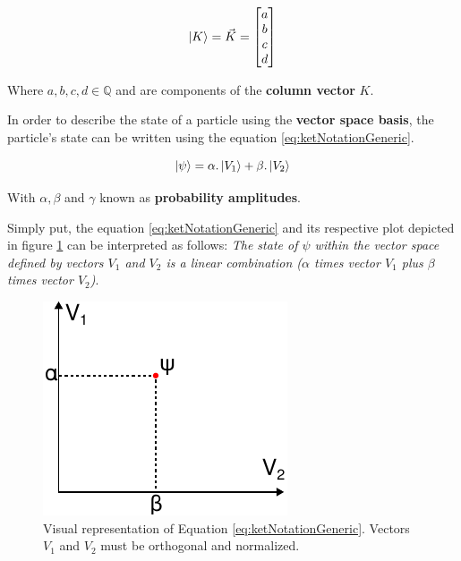 			\begin{equation}
				\ket{K} = \vec{K} = \begin{bmatrix}
					a \\
					b \\
					c \\
					d
				\end{bmatrix}
				\label{eq:ketNotationVector}
			\end{equation}
			
			\par Where $a, b, c, d \in \mathbb{Q}$ and are components of the \textbf{column vector} $K$.\newline

			\par In order to describe the state of a particle using the \textbf{vector space basis}, the particle's state can be written using the equation \ref{eq:ketNotationGeneric}.
			
			\begin{equation}
				\ket{\psi} = \alpha . \ket{V_1} + \beta . \ket{V_2}
				\label{eq:ketNotationGeneric}
			\end{equation}
		
			\par With $\alpha, \beta$ and $\gamma$ known as \textbf{probability amplitudes}.\newline
						
			\par Simply put, the equation \ref{eq:ketNotationGeneric} and its respective plot depicted in figure \ref{fig:diracPlot} can be interpreted as follows: \textit{The state of $\psi$ within the vector space defined by vectors $V_1$ and $V_2$ is a linear combination ($\alpha$ times vector $V_1$ plus $\beta$ times vector $V_2$)}.
			
			\begin{figure}[h]
				\centering
				\includegraphics{images/diracPlot}
				\caption{Visual representation of Equation \ref{eq:ketNotationGeneric}. Vectors $V_1$ and $V_2$ must be orthogonal and normalized.}
				\label{fig:diracPlot}
			\end{figure}
	
